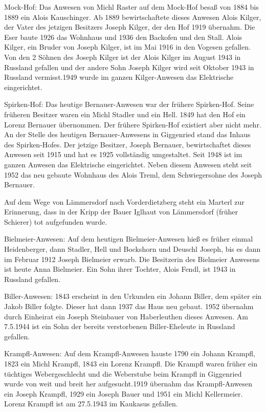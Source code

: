 \documentclass{book}
\begin{document}
Mock-Hof: Das Anwesen von Michl Raster auf dem Mock-Hof besaß von 1884 bis 1889
ein Alois Kauschinger. Ab 1889 bewirtschaftete dieses Anwesen Alois Kilger, der
Vater des jetzigen Besitzers Joseph Kilger, der den Hof 1919 übernahm. Die Eser
baute 1926 das Wohnhaus und 1936 den Backofen und den Stall. Alois Kilger, ein
Bruder von Joseph Kilger, ist im Mai 1916 in den Vogesen gefallen. Von den 2
Söhnen des Joseph Kilger ist der Alois Kilger im August 1943 in Russland
gefallen und der andere Sohn Joseph Kilger wird seit Oktober 1943 in Russland
vermisst.1949 wurde im ganzen Kilger-Anwesen das Elektrische eingerichtet.

Spirken-Hof: Das heutige Bernauer-Anwesen war der frühere Spirken-Hof. Seine
früheren Besitzer waren ein Michl Stadler und ein Hell. 1849 hat den Hof ein
Lorenz Bernauer übernommen. Der frühere Spirken-Hof existiert aber nicht mehr.
An der Stelle des heutigen Bernauer-Anwesens in Giggenried stand das Inhaus des
Spirken-Hofes. Der jetzige Besitzer, Joseph Bernauer, bewirtschaftet dieses
Anwesen seit 1915 und hat es 1925 vollständig umgestaltet. Seit 1948 ist im
ganzen Anwesen das Elektrische eingerichtet. Neben diesem Anwesen steht seit
1952 das neu gebaute Wohnhaus des Alois Treml, dem Schwiegersohne des Joseph
Bernauer.

Auf dem Wege von Lämmersdorf nach Vorderdietzberg steht ein Marterl zur
Erinnerung, dass in der Kripp der Bauer Iglhaut von Lämmersdorf (früher
Schierer) tot aufgefunden wurde.

Bielmeier-Anwesen: Auf dem heutigen Bielmeier-Anwesen hieß es früher einmal
Heidenberger, dann Stadler, Hell und Bockshorn und Deuschl Joseph, bis es dann
im Februar 1912 Joseph Bielmeier erwarb. Die Besitzerin des Bielmeier Anwesens
ist heute Anna Bielmeier. Ein Sohn ihrer Tochter, Alois Fendl, ist 1943 in
Russland gefallen.

Biller-Anwesen: 1843 erscheint in den Urkunden ein Johann Biller, dem später ein
Jakob Biller folgte. Dieser hat dann 1937 das Haus neu gebaut. 1952 übernahm
durch Einheirat ein Joseph Steinbauer von Haberleuthen dieses Anwesen. Am
7.5.1944 ist ein Sohn der bereits verstorbenen Biller-Eheleute in Russland
gefallen.

Krampfl-Anwesen: Auf dem Krampfl-Anwesen hauste 1790 ein Johann Krampfl, 1823
ein Michl Krampfl, 1843 ein Lorenz Krampfl. Die Krampfl waren früher ein
tüchtiges Webergeschlecht und die Weberstube beim Krampfl in Giggenried wurde
von weit und breit her aufgesucht.1919 übernahm das Krampfl-Anwesen ein Joseph
Krampfl, 1929 ein Joseph Bauer und 1951 ein Michl Kellermeier. Lorenz Krampfl
ist am 27.5.1943 im Kaukasus gefallen.
\end{document}
